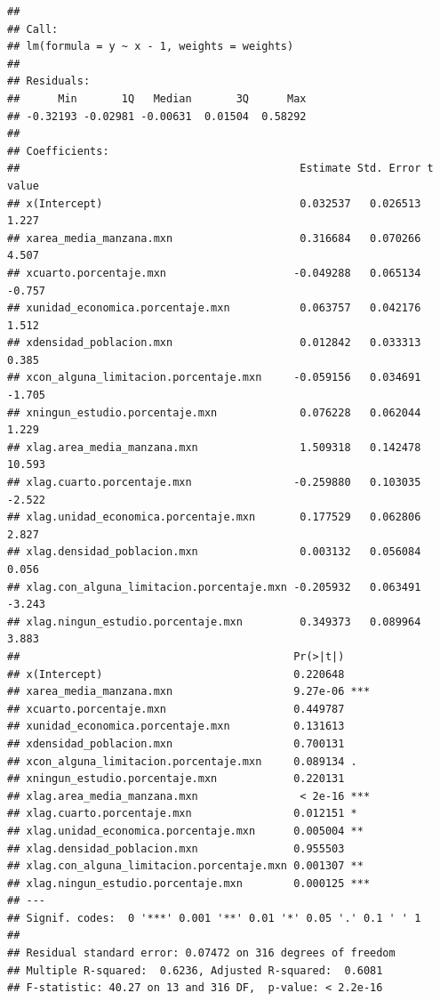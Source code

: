\documentclass[12pt,]{book}
\newenvironment{Shaded}{\begin{snugshade}}{\end{snugshade}}
\newcommand{\KeywordTok}[1]{\textcolor[rgb]{0.13,0.29,0.53}{\textbf{#1}}}
\newcommand{\DataTypeTok}[1]{\textcolor[rgb]{0.13,0.29,0.53}{#1}}
\newcommand{\CommentTok}[1]{\textcolor[rgb]{0.56,0.35,0.01}{\textit{#1}}}
\newcommand{\OperatorTok}[1]{\textcolor[rgb]{0.81,0.36,0.00}{\textbf{#1}}}
\newcommand{\NormalTok}[1]{#1}
\begin{document}
\begin{Shaded}
\end{Shaded}

\begin{verbatim}
## 
## Call:
## lm(formula = y ~ x - 1, weights = weights)
## 
## Residuals:
##      Min       1Q   Median       3Q      Max 
## -0.32193 -0.02981 -0.00631  0.01504  0.58292 
## 
## Coefficients:
##                                            Estimate Std. Error t value
## x(Intercept)                               0.032537   0.026513   1.227
## xarea_media_manzana.mxn                    0.316684   0.070266   4.507
## xcuarto.porcentaje.mxn                    -0.049288   0.065134  -0.757
## xunidad_economica.porcentaje.mxn           0.063757   0.042176   1.512
## xdensidad_poblacion.mxn                    0.012842   0.033313   0.385
## xcon_alguna_limitacion.porcentaje.mxn     -0.059156   0.034691  -1.705
## xningun_estudio.porcentaje.mxn             0.076228   0.062044   1.229
## xlag.area_media_manzana.mxn                1.509318   0.142478  10.593
## xlag.cuarto.porcentaje.mxn                -0.259880   0.103035  -2.522
## xlag.unidad_economica.porcentaje.mxn       0.177529   0.062806   2.827
## xlag.densidad_poblacion.mxn                0.003132   0.056084   0.056
## xlag.con_alguna_limitacion.porcentaje.mxn -0.205932   0.063491  -3.243
## xlag.ningun_estudio.porcentaje.mxn         0.349373   0.089964   3.883
##                                           Pr(>|t|)    
## x(Intercept)                              0.220648    
## xarea_media_manzana.mxn                   9.27e-06 ***
## xcuarto.porcentaje.mxn                    0.449787    
## xunidad_economica.porcentaje.mxn          0.131613    
## xdensidad_poblacion.mxn                   0.700131    
## xcon_alguna_limitacion.porcentaje.mxn     0.089134 .  
## xningun_estudio.porcentaje.mxn            0.220131    
## xlag.area_media_manzana.mxn                < 2e-16 ***
## xlag.cuarto.porcentaje.mxn                0.012151 *  
## xlag.unidad_economica.porcentaje.mxn      0.005004 ** 
## xlag.densidad_poblacion.mxn               0.955503    
## xlag.con_alguna_limitacion.porcentaje.mxn 0.001307 ** 
## xlag.ningun_estudio.porcentaje.mxn        0.000125 ***
## ---
## Signif. codes:  0 '***' 0.001 '**' 0.01 '*' 0.05 '.' 0.1 ' ' 1
## 
## Residual standard error: 0.07472 on 316 degrees of freedom
## Multiple R-squared:  0.6236, Adjusted R-squared:  0.6081 
## F-statistic: 40.27 on 13 and 316 DF,  p-value: < 2.2e-16
\end{verbatim}
\end{document}
